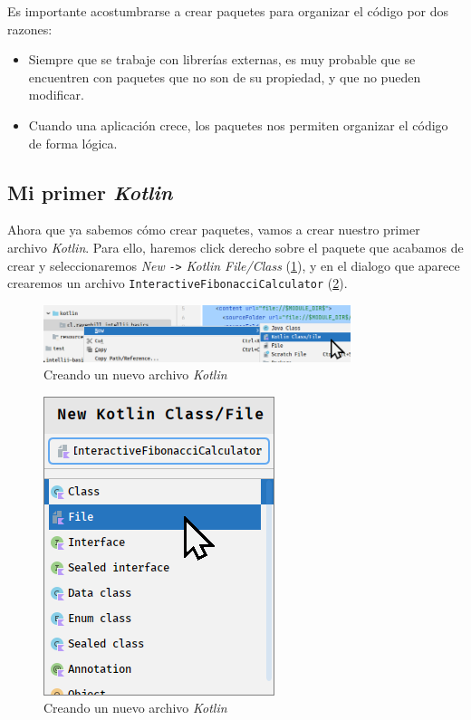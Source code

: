     Es importante acostumbrarse a crear paquetes para organizar el código por dos razones:
    \begin{itemize}
      \item Siempre que se trabaje con librerías externas, es muy probable que se encuentren con 
        paquetes que no son de su propiedad, y que no pueden modificar.
      \item Cuando una aplicación crece, los paquetes nos permiten organizar el código de forma 
        lógica.
    \end{itemize}

  \subsection{Mi primer \textit{Kotlin}}
    Ahora que ya sabemos cómo crear paquetes, vamos a crear nuestro primer archivo \textit{Kotlin}.
    Para ello, haremos click derecho sobre el paquete que acabamos de crear y seleccionaremos
    \textit{New} \texttt{->} \textit{Kotlin File/Class} (\cref{fig:idea64_new_kotlin_file}), y en
    el dialogo que aparece crearemos un archivo \texttt{InteractiveFibonacciCalculator} 
    (\cref{fig:idea64_new_kotlin_file_dialog}).

    \begin{figure}[ht!]
      \centering
      \includegraphics[width=0.8\textwidth]{img/Por_algo_se_empieza/idea64_new_kotlin_file.png}
      \caption{Creando un nuevo archivo \textit{Kotlin}}
      \label{fig:idea64_new_kotlin_file}
    \end{figure}

    \begin{figure}[H]
      \centering
      \includegraphics{img/Por_algo_se_empieza/idea64_new_kotlin_file_dialog.png}
      \caption{Creando un nuevo archivo \textit{Kotlin}}
      \label{fig:idea64_new_kotlin_file_dialog}
    \end{figure}

